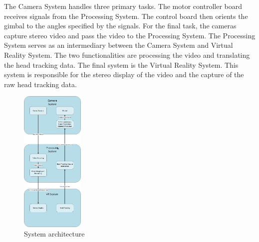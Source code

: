 The Camera System handles three primary tasks. The motor controller board receives signals from the Processing System. The control board then orients the gimbal to the angles specified by the signals. For the final task, the cameras capture stereo video and pass the video to the Processing System. The Processing System serves as an intermediary between the Camera System and Virtual Reality System. The two functionalities are processing the video and translating the head tracking data. The final system is the Virtual Reality System. This system is responsible for the stereo display of the video and the capture of the raw head tracking data.

\begin{figure}[h!]
	\centering
 	\includegraphics[width=0.27\textwidth]{images/Overview}
 \caption{System architecture}
\end{figure}
